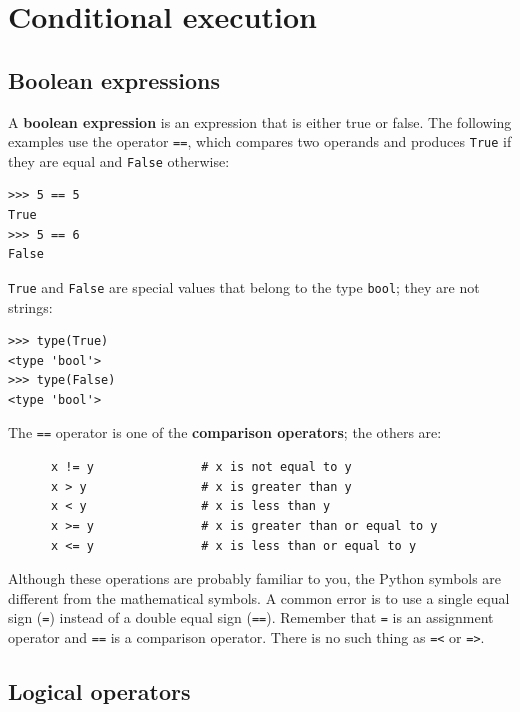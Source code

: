 \documentclass[10pt]{book}
\begin{document}
\chapter{Conditional execution}

\section{Boolean expressions}

A {\bf boolean expression} is an expression that is either true
or false.  The following examples use the 
operator {\tt ==}, which compares two operands and produces
{\tt True} if they are equal and {\tt False} otherwise:

\beforeverb
\begin{verbatim}
>>> 5 == 5
True
>>> 5 == 6
False
\end{verbatim}
\afterverb
%
{\tt True} and {\tt False} are special
values that belong to the type {\tt bool}; they are not strings:


\beforeverb
\begin{verbatim}
>>> type(True)
<type 'bool'>
>>> type(False)
<type 'bool'>
\end{verbatim}
\afterverb
%
The {\tt ==} operator is one of the {\bf comparison operators}; the
others are:

\beforeverb
\begin{verbatim}
      x != y               # x is not equal to y
      x > y                # x is greater than y
      x < y                # x is less than y
      x >= y               # x is greater than or equal to y
      x <= y               # x is less than or equal to y
\end{verbatim}
\afterverb
%
Although these operations are probably familiar to you, the Python
symbols are different from the mathematical symbols.  A common error
is to use a single equal sign ({\tt =}) instead of a double equal sign
({\tt ==}).  Remember that {\tt =} is an assignment operator and
{\tt ==} is a comparison operator.   There is no such thing as
{\tt =<} or {\tt =>}.



\section {Logical operators}
\end{document}

